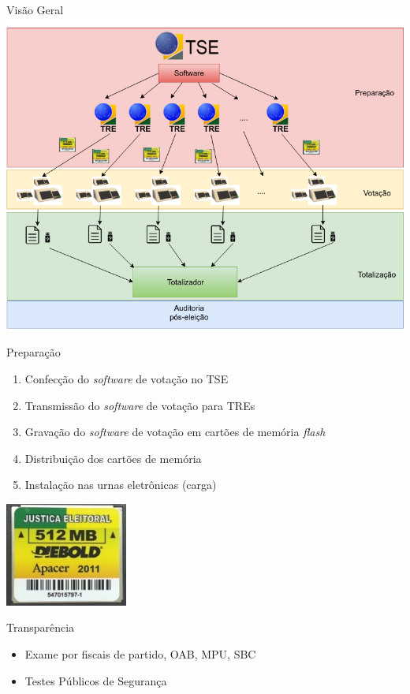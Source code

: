 \documentclass[10pt]{beamer}
\begin{document}
\begin{frame}{Visão Geral}
\includegraphics[width=\textwidth]{TSE.png}
\end{frame}


\begin{frame}{Preparação}
\begin{minipage}{0.75\textwidth}
\begin{enumerate}
 \item Confecção do \emph{software} de votação no TSE
 \item Transmissão do \emph{software} de votação para TREs
 \item Gravação do \emph{software} de votação em cartões de memória \emph{flash}
 \item Distribuição dos cartões de memória
 \item Instalação nas urnas eletrônicas (carga)
\end{enumerate}
\end{minipage}
\includegraphics[scale=0.45]{flash.jpg}

\bigskip

\begin{flushright}
\begin{minipage}{.75\textwidth}
\begin{block}{\alert{Transparência}}\medskip
\begin{itemize}
 \item Exame por fiscais de partido, OAB, MPU, SBC
 \item Testes Públicos de Segurança
\end{itemize}
\end{block}
\end{minipage}
\end{flushright}
\end{frame}
\end{document}
